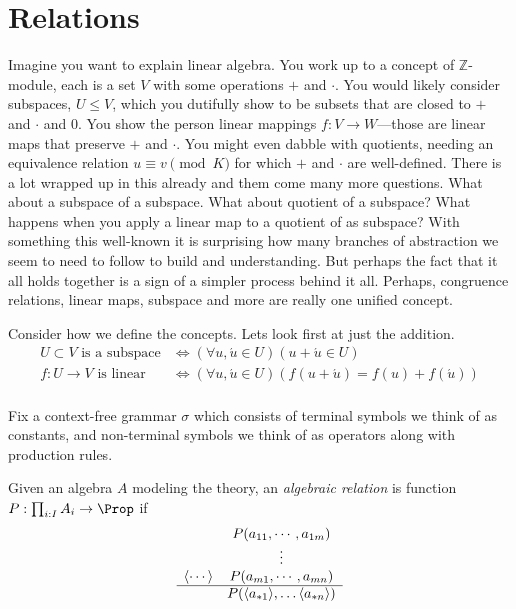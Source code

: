 
\section{Relations}
Imagine you want to explain linear algebra.  You work up to a concept of 
$\mathbb{Z}$-module, each is a set $V$ with some operations $+$ and $\cdot$. You would likely
consider subspaces, $U\leq V$, which you dutifully show to be subsets that are
closed to $+$ and $\cdot$ and $0$. You show the person linear mappings $f:V\to
W$---those are linear maps that preserve $+$ and $\cdot$.  You might even dabble
with quotients, needing an equivalence relation $u\equiv v\pmod{K}$ for which
$+$ and $\cdot$ are well-defined.  There is a lot wrapped up in this already and
them come many more questions.  What about a subspace of a subspace.  What about
quotient of a subspace? What happens when you apply a linear map to a quotient
of as subspace? With something this well-known it is surprising how many
branches of abstraction we seem to need to follow to build and understanding.
But perhaps the fact that it all holds together is a sign of a simpler process
behind it all. Perhaps, congruence relations, linear maps, subspace and more are
really one unified concept.


Consider how we define the concepts.  Lets look first at just the addition.
\begin{align*}
    U\subset V\text{ is a subspace} & \Leftrightarrow (\forall u,\acute{u}\in U)(u+\acute{u}\in U)\\
    f:U\to V\text{ is linear} & \Leftrightarrow (\forall u,\acute{u}\in U)(f(u+\acute{u})=f(u)+f(\acute{u}))\\
\end{align*}






Fix a context-free grammar $\sigma$ which consists of terminal symbols 
we think of as constants, and non-terminal symbols we think of as operators
along with production rules.


Given an algebra $A$ modeling the theory,
an \emph{algebraic relation} is function $P:\prod_{i:I} A_i\to \Prop$ if 
\begin{align*}
    \begin{array}{cc}
        & P(a_{11}, \cdots, a_{1m})\\
        & \vdots \\
        \langle\cdots\rangle & P(a_{m1}, \cdots, a_{mn})\\
    \hline
       & P(\langle a_{*1}\rangle,\ldots \langle a_{*n}\rangle)
    \end{array}
\end{align*}

